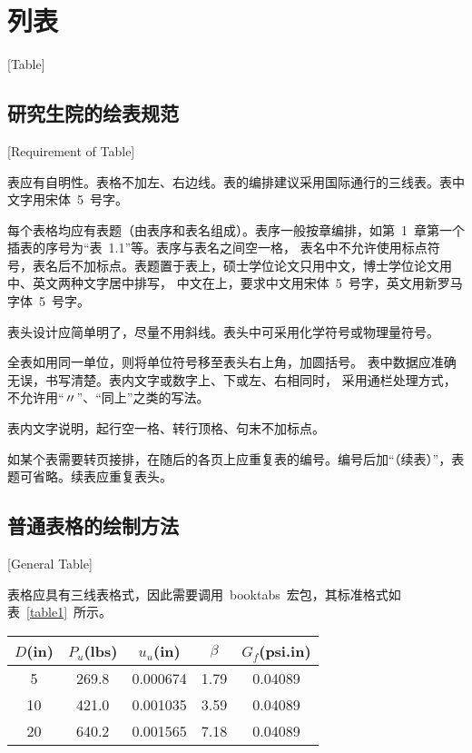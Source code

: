 
%
%
%

\chapter{列表}[Table]
\label{chap04}

\section{研究生院的绘表规范}[Requirement of Table]

表应有自明性。表格不加左、右边线。表的编排建议采用国际通行的三线表。表中文字用宋体~5~号字。

每个表格均应有表题（由表序和表名组成）。表序一般按章编排，如第~1~章第一个插表的序号为“表~1.1”等。表序与表名之间空一格，
表名中不允许使用标点符号，表名后不加标点。表题置于表上，硕士学位论文只用中文，博士学位论文用中、英文两种文字居中排写，
中文在上，要求中文用宋体~5~号字，英文用新罗马字体~5~号字。

表头设计应简单明了，尽量不用斜线。表头中可采用化学符号或物理量符号。

全表如用同一单位，则将单位符号移至表头右上角，加圆括号。
表中数据应准确无误，书写清楚。表内文字或数字上、下或左、右相同时，
采用通栏处理方式，不允许用“〃”、“同上”之类的写法。

表内文字说明，起行空一格、转行顶格、句末不加标点。

如某个表需要转页接排，在随后的各页上应重复表的编号。编号后加“（续表）”，表题可省略。续表应重复表头。

\section{普通表格的绘制方法}[General Table]

表格应具有三线表格式，因此需要调用~booktabs~宏包，其标准格式如表~\ref{table1}~所示。
\begin{table}[htbp]
  \vspace{0.5em}\centering\wuhao
  \begin{tabular}{ccccc}
    \toprule[1.5pt]
    $D$(in) & $P_u$(lbs) & $u_u$(in) & $\beta$ & $G_f$(psi.in) \\
    \midrule[1pt]
    5       & 269.8      & 0.000674  & 1.79    & 0.04089       \\
    10      & 421.0      & 0.001035  & 3.59    & 0.04089       \\
    20      & 640.2      & 0.001565  & 7.18    & 0.04089       \\
    \bottomrule[1.5pt]
  \end{tabular}
\end{table}

